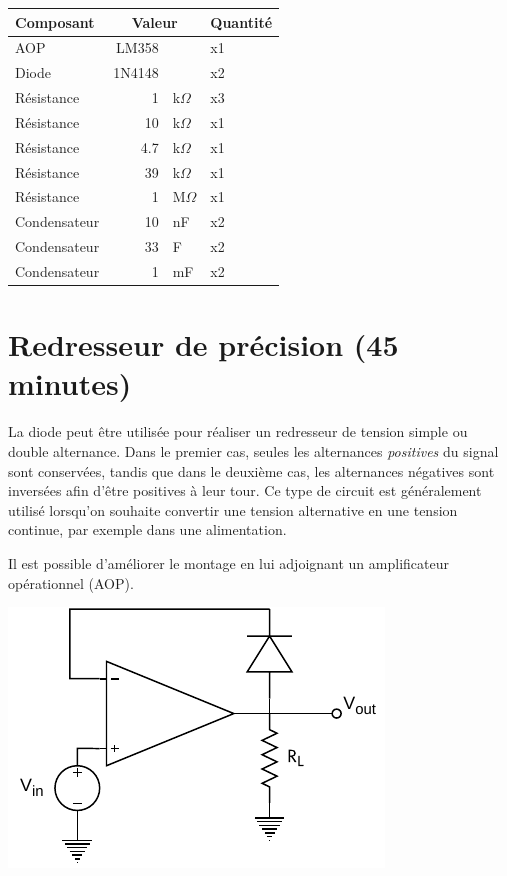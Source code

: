 \documentclass{../../template/labo}
\begin{document}
\begin{center}
	\begin{tabular}{p{}rlp{}}
		Composant & \multicolumn{2}{c}{Valeur} & Quantité \\\toprule
		\multirow{1}{*}{AOP} & LM358 & & x1 \\\midrule
		\multirow{1}{*}{Diode} & 1N4148 & & x2 \\\midrule
		\multirow{1}{*}{Résistance} 	& 1 & k$\Omega$ & x3 \\\midrule
		\multirow{1}{*}{Résistance} 	& 10 & k$\Omega$ & x1 \\\midrule
		\multirow{1}{*}{Résistance} 	& 4.7 & k$\Omega$ & x1 \\\midrule
		\multirow{1}{*}{Résistance} 	& 39 & k$\Omega$ & x1 \\\midrule
		\multirow{1}{*}{Résistance} 	& 1 & M$\Omega$ & x1 \\\midrule
		\multirow{1}{*}{Condensateur} 	& 10 & nF & x2 \\\midrule
		\multirow{1}{*}{Condensateur} 	& 33 & \textmu F & x2 \\\midrule
		\multirow{1}{*}{Condensateur} 	& 1 & mF & x2 \\\bottomrule
	\end{tabular}
\end{center}

\section{Redresseur de précision (45 minutes)}
La diode peut être utilisée pour réaliser un redresseur de tension simple ou double alternance.
Dans le premier cas, seules les alternances \textit{positives} du signal sont conservées, tandis que dans le deuxième cas, les alternances négatives sont inversées afin d'être positives à leur tour.
Ce type de circuit est généralement utilisé lorsqu'on souhaite convertir une tension alternative en une tension continue, par exemple dans une alimentation.

Il est possible d'améliorer le montage en lui adjoignant un amplificateur opérationnel (AOP).
\begin{center}
	\includegraphics[width=.5\textwidth]{precision-rectifier.pdf}
\end{center}
\end{document}
